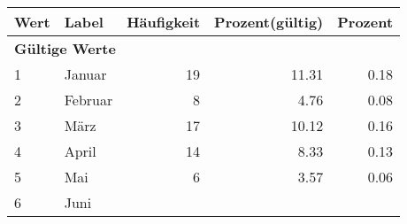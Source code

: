      \begin{longtable}{lXrrr}
     \toprule
     \textbf{Wert} & \textbf{Label} & \textbf{Häufigkeit} & \textbf{Prozent(gültig)} & \textbf{Prozent} \\
     \endhead
     \midrule
     \multicolumn{5}{l}{\textbf{Gültige Werte}}\\

     1 &
     \multicolumn{1}{X}{ Januar   } &


       \num{19} &
       \num[round-mode=places,round-precision=2]{11,31} &
         \num[round-mode=places,round-precision=2]{0,18} \\

     2 &
     \multicolumn{1}{X}{ Februar   } &


       \num{8} &
       \num[round-mode=places,round-precision=2]{4,76} &
         \num[round-mode=places,round-precision=2]{0,08} \\

     3 &
     \multicolumn{1}{X}{ März   } &


       \num{17} &
       \num[round-mode=places,round-precision=2]{10,12} &
         \num[round-mode=places,round-precision=2]{0,16} \\

     4 &
     \multicolumn{1}{X}{ April   } &


       \num{14} &
       \num[round-mode=places,round-precision=2]{8,33} &
         \num[round-mode=places,round-precision=2]{0,13} \\

     5 &
     \multicolumn{1}{X}{ Mai   } &


       \num{6} &
       \num[round-mode=places,round-precision=2]{3,57} &
         \num[round-mode=places,round-precision=2]{0,06} \\

     6 &
     \multicolumn{1}{X}{ Juni   } &



\end{longtable}
